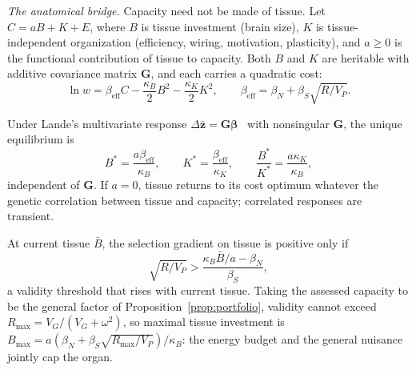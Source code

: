 \emph{The anatomical bridge.} Capacity need not be made of tissue. Let $C=aB+K+E$, where $B$ is tissue investment (brain
size), $K$ is tissue-independent organization (efficiency, wiring, motivation, plasticity), and $a\ge0$ is the functional
contribution of tissue to capacity. Both $B$ and $K$ are heritable with additive covariance matrix $\mathbf G$, and each
carries a quadratic cost:
\begin{equation}
\ln w=\beta_{\mathrm{eff}}C-\frac{\kappa_B}2B^2-\frac{\kappa_K}2K^2,\qquad\beta_{\mathrm{eff}}=\beta_N+\beta_S\sqrt{R/V_P}.\label{eq:tissuefit}
\end{equation}

\begin{proposition}\label{prop:tissue}
Under Lande's multivariate response $\Delta\bar{\mathbf z}=\mathbf G\bm\beta$~\cite{lande1979,lande1983} with nonsingular
$\mathbf G$, the unique equilibrium is
\begin{equation}
B^*=\frac{a\beta_{\mathrm{eff}}}{\kappa_B},\qquad K^*=\frac{\beta_{\mathrm{eff}}}{\kappa_K},\qquad\frac{B^*}{K^*}=\frac{a\kappa_K}{\kappa_B},\label{eq:tissue}
\end{equation}
independent of $\mathbf G$. If $a=0$, tissue returns to its cost optimum whatever the genetic correlation between tissue and
capacity; correlated responses are transient.
\end{proposition}

\begin{corollary}\label{cor:colimit}
At current tissue $\bar B$, the selection gradient on tissue is positive only if
\begin{equation}
\sqrt{R/V_P}>\frac{\kappa_B\bar B/a-\beta_N}{\beta_S},\label{eq:threshold}
\end{equation}
a validity threshold that rises with current tissue. Taking the assessed capacity to be the general factor of
Proposition~\ref{prop:portfolio}, validity cannot exceed $R_{\max}=V_G/(V_G+\omega^2)$, so maximal tissue investment is
$B_{\max}=a(\beta_N+\beta_S\sqrt{R_{\max}/V_P})/\kappa_B$: the energy budget and the general nuisance jointly cap the organ.
\end{corollary}

